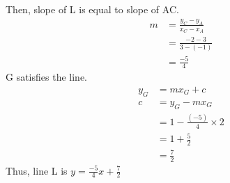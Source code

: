 \documentclass[12pt, a4paper]{article}
\begin{document}
\begin{enumerate}
    Then, slope of L is equal to slope of AC.
    \begin{align*}
        m&= \frac{y_C - y_A}{x_C - x_A}
        \\
        &= \frac{-2 - 3}{3 - (-1)}
        \\
        &=\frac{-5}{4}
    \end{align*}
    G satisfies the line.
    \begin{align*}
        y_G&= mx_G + c
        \\
        c&= y_G - mx_G
        \\
        &= 1 - \frac{(-5)}{4} \times 2
        \\
        &= 1 + \frac{5}{2}
        \\
        &= \frac{7}{2}
    \end{align*}
    Thus, line L is $y = \frac{-5}{4}x + \frac{7}{2}$
\end{enumerate}
\end{document}
